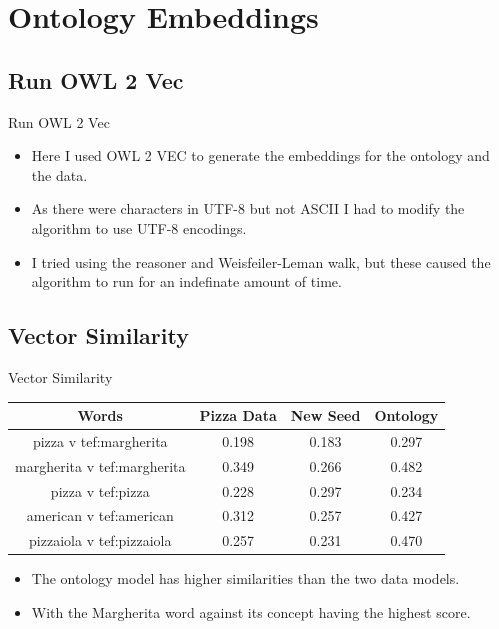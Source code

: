 \documentclass{beamer}
\begin{document}
\section{Ontology Embeddings}
\subsection{Run OWL 2 Vec}
\begin{frame}{Run OWL 2 Vec}
	\begin{itemize}
		\item Here I used OWL 2 VEC to generate the embeddings for the ontology and the data.
		\item As there were characters in UTF-8 but not ASCII I had to modify the algorithm to use UTF-8 encodings.
		\item I tried using the reasoner and Weisfeiler-Leman walk, but these caused the algorithm to run for an indefinate amount of time.
	\end{itemize}
\end{frame}

\subsection{Vector Similarity}
\begin{frame}{Vector Similarity}
\begin{center}
	\begin{tabular}{ | c | c | c | c |}
		\hline
		\textbf{Words} & \textbf{Pizza Data} & \textbf{New Seed} & \textbf{Ontology} \\
		\hline
		pizza v tef:margherita & 0.198 & 0.183 & 0.297\\
		\hline
		margherita v tef:margherita & 0.349 & 0.266 & 0.482 \\
		\hline
		pizza v tef:pizza & 0.228 & 0.297 & 0.234 \\
		\hline
		american v tef:american & 0.312 & 0.257 & 0.427 \\
		\hline
		pizzaiola v tef:pizzaiola & 0.257 & 0.231 & 0.470 \\
		\hline
	\end{tabular}
\end{center}

\begin{itemize}
	\item The ontology model has higher similarities than the two data models.
	\item With the Margherita word against its concept having the highest score.
\end{itemize}
\end{frame}
\end{document}
